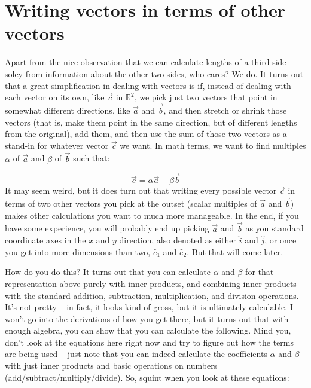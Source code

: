 \documentclass[
]{book}
\begin{document}
\hypertarget{writing-vectors-in-terms-of-other-vectors}{%
\section{Writing vectors in terms of other vectors}\label{writing-vectors-in-terms-of-other-vectors}}

Apart from the nice observation that we can calculate lengths of a third side soley from information about the other two sides, who cares? We do. It turns out that a great simplification in dealing with vectors is if, instead of dealing with each vector on its own, like \(\vec{c}\) in \(\mathbb{R}^2\), we pick just two vectors that point in somewhat different directions, like \(\vec{a}\) and \(\vec{b}\), and then stretch or shrink those vectors (that is, make them point in the same direction, but of different lengths from the original), add them, and then use the sum of those two vectors as a stand-in for whatever vector \(\vec{c}\) we want. In math terms, we want to find multiples \(\alpha\) of \(\vec{a}\) and \(\beta\) of \(\vec{b}\) such that:

\[\vec{c} = \alpha\vec{a} + \beta\vec{b}\]
It may seem weird, but it does turn out that writing every possible vector \(\vec{c}\) in terms of two other vectors you pick at the outset (scalar multiples of \(\vec{a}\) and \(\vec{b}\)) makes other calculations you want to much more manageable. In the end, if you have some experience, you will probably end up picking \(\vec{a}\) and \(\vec{b}\) as you standard coordinate axes in the \(x\) and \(y\) direction, also denoted as either \(\hat{i}\) and \(\hat{j}\), or once you get into more dimensions than two, \(\hat{e}_{1}\) and \(\hat{e}_{2}\). But that will come later.

How do you do this? It turns out that you can calculate \(\alpha\) and \(\beta\) for that representation above purely with inner products, and combining inner products with the standard addition, subtraction, multiplication, and division operations. It's not pretty -- in fact, it looks kind of gross, but it is ultimately calculable. I won't go into the derivations of how you get there, but it turns out that with enough algebra, you can show that you can calculate the following. Mind you, don't look at the equations here right now and try to figure out how the terms are being used -- just note that you can indeed calculate the coefficients \(\alpha\) and \(\beta\) with just inner products and basic operations on numbers (add/subtract/multiply/divide). So, squint when you look at these equations:
\end{document}
